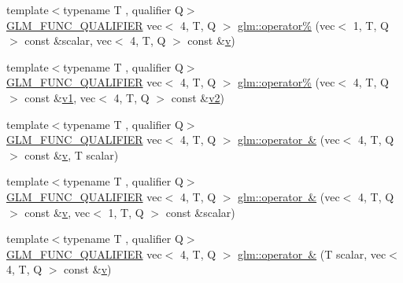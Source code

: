 \begin{DoxyCompactItemize}
\item 
{\footnotesize template$<$typename T , qualifier Q$>$ }\\\mbox{\hyperlink{setup_8hpp_a33fdea6f91c5f834105f7415e2a64407}{G\+L\+M\+\_\+\+F\+U\+N\+C\+\_\+\+Q\+U\+A\+L\+I\+F\+I\+ER}} vec$<$ 4, T, Q $>$ \mbox{\hyperlink{namespaceglm_ae22e7cac5143bb61279a31d754ef7845}{glm\+::operator\%}} (vec$<$ 1, T, Q $>$ const \&scalar, vec$<$ 4, T, Q $>$ const \&\mbox{\hyperlink{_s_d_l__opengl_8h_a10a82eabcb59d2fcd74acee063775f90}{v}})
\item 
{\footnotesize template$<$typename T , qualifier Q$>$ }\\\mbox{\hyperlink{setup_8hpp_a33fdea6f91c5f834105f7415e2a64407}{G\+L\+M\+\_\+\+F\+U\+N\+C\+\_\+\+Q\+U\+A\+L\+I\+F\+I\+ER}} vec$<$ 4, T, Q $>$ \mbox{\hyperlink{namespaceglm_a1529a2e6ed800871f12e3ede47fa4ea9}{glm\+::operator\%}} (vec$<$ 4, T, Q $>$ const \&\mbox{\hyperlink{_s_d_l__opengl__glext_8h_a435c176a02c061b43e19bdf7c86cceae}{v1}}, vec$<$ 4, T, Q $>$ const \&\mbox{\hyperlink{_s_d_l__opengl__glext_8h_a0928f6d0f0f794ba000a21dfae422136}{v2}})
\item 
{\footnotesize template$<$typename T , qualifier Q$>$ }\\\mbox{\hyperlink{setup_8hpp_a33fdea6f91c5f834105f7415e2a64407}{G\+L\+M\+\_\+\+F\+U\+N\+C\+\_\+\+Q\+U\+A\+L\+I\+F\+I\+ER}} vec$<$ 4, T, Q $>$ \mbox{\hyperlink{namespaceglm_a1d13992a19cc7b4f4a41638f60fa453b}{glm\+::operator \&}} (vec$<$ 4, T, Q $>$ const \&\mbox{\hyperlink{_s_d_l__opengl_8h_a10a82eabcb59d2fcd74acee063775f90}{v}}, T scalar)
\item 
{\footnotesize template$<$typename T , qualifier Q$>$ }\\\mbox{\hyperlink{setup_8hpp_a33fdea6f91c5f834105f7415e2a64407}{G\+L\+M\+\_\+\+F\+U\+N\+C\+\_\+\+Q\+U\+A\+L\+I\+F\+I\+ER}} vec$<$ 4, T, Q $>$ \mbox{\hyperlink{namespaceglm_a9994dfc428940eb53898d2d3006040af}{glm\+::operator \&}} (vec$<$ 4, T, Q $>$ const \&\mbox{\hyperlink{_s_d_l__opengl_8h_a10a82eabcb59d2fcd74acee063775f90}{v}}, vec$<$ 1, T, Q $>$ const \&scalar)
\item 
{\footnotesize template$<$typename T , qualifier Q$>$ }\\\mbox{\hyperlink{setup_8hpp_a33fdea6f91c5f834105f7415e2a64407}{G\+L\+M\+\_\+\+F\+U\+N\+C\+\_\+\+Q\+U\+A\+L\+I\+F\+I\+ER}} vec$<$ 4, T, Q $>$ \mbox{\hyperlink{namespaceglm_a1ad8b2c871dcdaa164cfa7f59f2597ae}{glm\+::operator \&}} (T scalar, vec$<$ 4, T, Q $>$ const \&\mbox{\hyperlink{_s_d_l__opengl_8h_a10a82eabcb59d2fcd74acee063775f90}{v}})
\item 

\end{DoxyCompactItemize}
